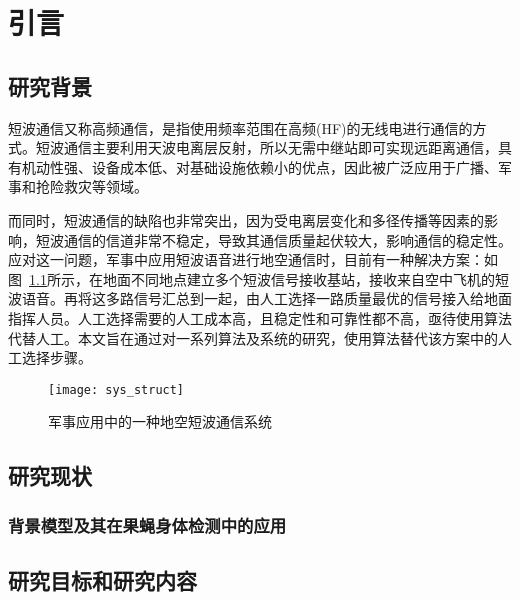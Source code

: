 
\chapter{引言}
\label{chap:introduction}

\section{研究背景}

短波通信又称高频通信，是指使用频率范围在高频(HF)的无线电进行通信的方式\cite{董彬虹2007短波通信的现状及发展趋势}。短波通信主要利用天波电离层反射，所以无需中继站即可实现远距离通信，具有机动性强、设备成本低、对基础设施依赖小的优点，因此被广泛应用于广播、军事和抢险救灾等领域。

而同时，短波通信的缺陷也非常突出，因为受电离层变化和多径传播等因素的影响，短波通信的信道非常不稳定，导致其通信质量起伏较大，影响通信的稳定性。应对这一问题，军事中应用短波语音进行地空通信时，目前有一种解决方案：如图~\ref{fig:sys_struct}所示，在地面不同地点建立多个短波信号接收基站，接收来自空中飞机的短波语音。再将这多路信号汇总到一起，由人工选择一路质量最优的信号接入给地面指挥人员。人工选择需要的人工成本高，且稳定性和可靠性都不高，亟待使用算法代替人工。本文旨在通过对一系列算法及系统的研究，使用算法替代该方案中的人工选择步骤。

\begin{figure}
\centering
\texttt{[image: sys\_struct]}
\caption{军事应用中的一种地空短波通信系统\label{fig:sys_struct}}
\end{figure}

\section{研究现状}


\subsection{背景模型及其在果蝇身体检测中的应用}


\section{研究目标和研究内容}

